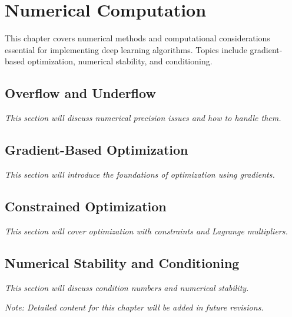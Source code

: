 
\chapter{Numerical Computation}
\label{chap:numerical-computation}

This chapter covers numerical methods and computational considerations essential for implementing deep learning algorithms. Topics include gradient-based optimization, numerical stability, and conditioning.

\section{Overflow and Underflow}

\textit{This section will discuss numerical precision issues and how to handle them.}

\section{Gradient-Based Optimization}

\textit{This section will introduce the foundations of optimization using gradients.}

\section{Constrained Optimization}

\textit{This section will cover optimization with constraints and Lagrange multipliers.}

\section{Numerical Stability and Conditioning}

\textit{This section will discuss condition numbers and numerical stability.}

\vspace{1em}
\noindent\textit{Note: Detailed content for this chapter will be added in future revisions.}
